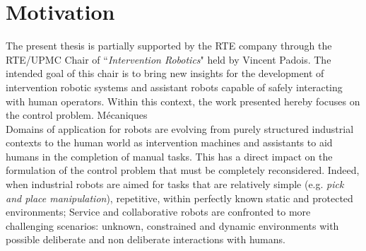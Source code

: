 \section{Motivation}
The present thesis is partially supported by the RTE company through the RTE/UPMC Chair of ``\textit{Intervention Robotics}" held by Vincent Padois. The intended goal of this chair is to bring new insights for the development of intervention robotic systems and assistant robots capable of safely interacting with human operators. Within this context, the work presented hereby focuses on the control problem. M\'ecaniques \\
Domains of application for robots are evolving from purely structured industrial contexts to the human world as intervention machines and assistants to aid humans in the completion of manual tasks. This has a direct impact on the formulation of the control problem that must be completely reconsidered. Indeed, when industrial robots are aimed for tasks that are relatively simple (e.g. \textit{pick and place manipulation}), repetitive, within perfectly known static and protected environments; Service and collaborative robots are confronted to more challenging scenarios: unknown, constrained and dynamic environments with possible deliberate and non deliberate interactions with humans. 
